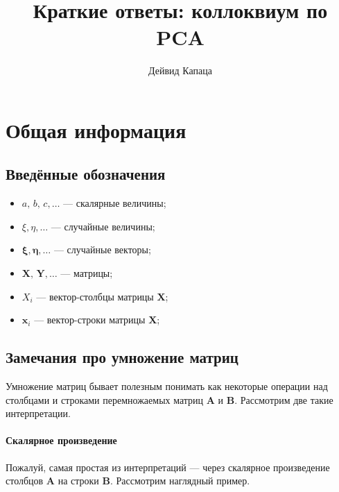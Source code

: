 \documentclass[12pt,a4paper,final]{article}
\author{Дейвид Капаца}
\title{Краткие ответы: коллоквиум по PCA}
\begin{document}
\maketitle
\tableofcontents

\section{Общая информация}

\subsection{Введённые обозначения}

\begin{itemize}
\item $a,\, b,\, c,\ldots$ --- скалярные величины;
\item $\xi, \eta, \ldots$ --- случайные величины;
\item $\bm \xi, \bm \eta, \ldots$ --- случайные векторы;
\item $\bm X,\, \bm Y, \ldots$ --- матрицы;
\item $X_i$ --- вектор-столбцы матрицы $\bm X$;
\item $\bm x_i$ --- вектор-строки матрицы $\bm X$;

\end{itemize}

\subsection{Замечания про умножение матриц}

Умножение матриц бывает полезным понимать как некоторые операции над столбцами и строками перемножаемых матриц $\bm A$ и $\bm B$. Рассмотрим две такие интерпретации.

\paragraph*{Скалярное произведение}
Пожалуй, самая простая из интерпретаций --- через скалярное произведение столбцов $\bm A$ на строки $\bm B$. Рассмотрим наглядный пример.
\end{document}
